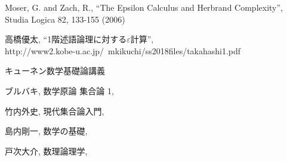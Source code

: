 \begin{thebibliography}{数字}
	 Moser, G. and Zach, R., ``The Epsilon Calculus and Herbrand Complexity'',
		Studia Logica 82, 133-155 (2006)
	
	 高橋優太, ``1階述語論理に対する$\varepsilon$計算'', \\
		http://www2.kobe-u.ac.jp/~mkikuchi/ss2018files/takahashi1.pdf 
		
	 キューネン数学基礎論講義
	
	 ブルバキ, 数学原論 集合論 1, 
	
	 竹内外史, 現代集合論入門, 
	
	 島内剛一, 数学の基礎,
	
	 戸次大介, 数理論理学,
\end{thebibliography}
